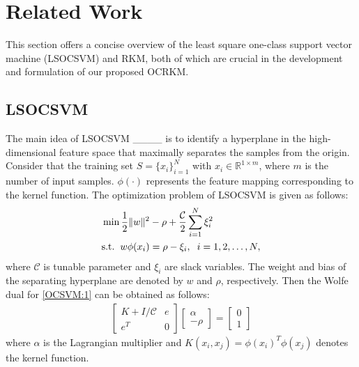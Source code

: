 \section{Related Work}
\label{Related Work}
This section offers a concise overview of the least square one-class support vector machine (LSOCSVM) and RKM, both of which are crucial in the development and formulation of our proposed OCRKM.
\subsection{LSOCSVM}
The main idea of LSOCSVM ____ is to identify a hyperplane in the high-dimensional feature space that maximally separates the samples from the origin. Consider that the training set $S=\{x_i\}_{i=1}^N$ with \(x_i \in \mathbb{R}^{1 \times m}\), where \(m\) is the number of input samples. $\phi(\cdot)$ represents the feature mapping corresponding to the kernel function. The optimization problem of LSOCSVM is given as follows:
\begin{align}
\label{OCSVM:1}
    &\min\frac{1}{2}\|w\|^2 - \rho +  \frac{\mathcal{C}}{2}\sum_{i=1}^N \xi_i^2 \nonumber \\
    &\text{s.t.} \hspace{0.2cm} w\phi(x_i) = \rho - \xi_i, \hspace{0.2cm} i=1,2,\ldots, N,
\end{align}
where $\mathcal{C}$ is tunable parameter and $\xi_i$ are slack variables. The weight and bias of the separating hyperplane are denoted by $w$ and $\rho$, respectively. Then the Wolfe dual for \eqref{OCSVM:1} can be obtained as follows:
\begin{align}
\left[\begin{array}{c|c } 
	 K + I/\mathcal{C} & e  \\  
	\hline 
	 e^T    & 0  
\end{array}\right]
    \begin{bmatrix}
    \alpha \\ -\rho 
    \end{bmatrix}  =  \begin{bmatrix} 0 \\   1   \end{bmatrix}
\end{align}
where $\alpha$ is the Lagrangian multiplier and \(K(x_i, x_j) = \phi(x_i)^T\phi(x_j)\) denotes the kernel function.

